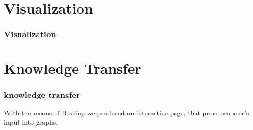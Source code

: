 \documentclass {beamer}
\begin{document}
\section{Visualization}
\begin{frame}
\frametitle{Visualization}

\end{frame}


\section{Knowledge Transfer}
\begin{frame}
\frametitle{knowledge transfer}
With the means of R shiny we produced an interactive page, that processes user's input into graphs.

\end{frame}
\end{document}
